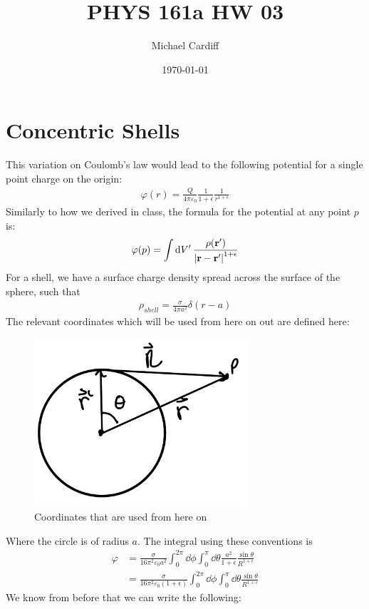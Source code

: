 \documentclass[12pt]{article}
\title{\vspace{-3em}PHYS 161a HW 03}
\author{Michael Cardiff}
\date{\today}
\newcommand{\vphi}{\varphi}
\newcommand{\eps}{\epsilon}
\begin{document}
\maketitle
\section{Concentric Shells}
This variation on Coulomb's law would lead to the following potential for a single point charge on the origin:
\begin{align*}
  \vphi(r)=\frac{Q}{4\pi\varepsilon_0}\frac1{1+\epsilon}\frac1{r^{1+\eps}}
\end{align*}
Similarly to how we derived in class, the formula for the potential at any point $p$ is:
\begin{align*}
  \vphi(p)=\int\dd{V'}\frac{\rho(\vb{r}')}{\abs{\vb{r-r}'}^{1+\eps}}
\end{align*}
For a shell, we have a surface charge density spread across the surface of the sphere, such that
\begin{align*}
  \rho_{shell}=\frac{\sigma}{4\pi a^2}\delta(r-a)
\end{align*}
The relevant coordinates which will be used from here on out are defined here:
\begin{figure}[H]
  \centering
  \includegraphics[width=8.0cm]{coords}
  \caption{Coordinates that are used from here on}
\end{figure}
Where the circle is of radius $a$. The integral using these conventions is
\begin{align*}
  \vphi&=\frac{\sigma}{16\pi^2 \varepsilon_0a^2}
  \int_0^{2\pi}\dd{\phi}\int_0^{\pi}\dd{\theta}\frac{a^2}{1+\eps}
  \frac{\sin\theta}{R^{1+\eps}}\\
  &=\frac\sigma{16\pi^2\varepsilon_0(1+\eps)}
  \int_0^{2\pi}\dd{\phi}\int_0^{\pi}\dd{\theta}\frac{\sin\theta}{R^{1+\eps}}
\end{align*}
We know from before that we can write the following:
\end{document}
